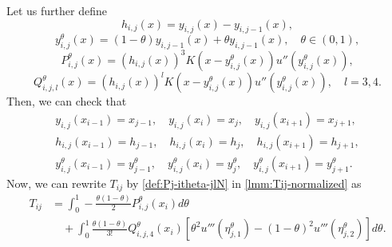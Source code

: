 \documentclass{amsart}
\newtheorem{lemma}[theorem]{Lemma}
\theoremstyle{definition}
\theoremstyle{remark}
\numberwithin{equation}{section}
\begin{document}
Let us further define 
  \begin{equation} \label{def:hij}
    h_{i,j}(x) = y_{i,j}(x) - y_{i,j-1}(x),
  \end{equation}
  \begin{equation} \label{def:yijt}
    y_{i,j}^\theta(x) = (1-\theta) y_{i,j-1}(x) + \theta y_{i,j-1}(x), \quad \theta \in (0, 1),
  \end{equation}
  \begin{equation} \label{def:Pj-itheta-jlN}
    {P_{i,j}^\theta}(x) = ({h_{i,j}}(x))^3  K(x - {y_{i,j}^\theta}(x) ) u''({y_{i,j}^\theta}(x)),
  \end{equation}
  \begin{equation} \label{def:Qj-itheta-jlN}
    {Q_{i,j,l}^{\theta}}(x) = ({h_{i,j}}(x))^l K(x - {y_{i,j}^\theta}(x)) u''({y_{i,j}^\theta}(x)), \quad l=3, 4.
  \end{equation}
Then, we can check that
\begin{equation} \label{eq:prop-of-GMFs}
    \begin{gathered}
      y_{i,j}(x_{i-1}) = x_{j-1}, \quad y_{i,j}(x_{i}) = x_{j}, \quad y_{i,j}(x_{i+1}) = x_{j+1}, \\
      h_{i,j}(x_{i-1}) = h_{j-1}, \quad h_{i,j}(x_{i}) = h_j, \quad h_{i,j}(x_{i+1}) = h_{j+1}, \\
      y_{i,j}^\theta(x_{i-1}) = y_{j-1}^\theta, \quad y_{i,j}^\theta(x_{i}) = y_{j}^\theta, \quad y_{i,j}^\theta(x_{i+1}) = y_{j+1}^\theta.
    \end{gathered}
\end{equation}
Now, we can rewrite \(T_{ij}\) by \eqref{def:Pj-itheta-jlN} in \eqref{lmm:Tij-normalized} as
  \begin{equation} \label{lmm:Tij-express-as-int-of-function}
    \begin{aligned}
      T_{ij} & = \int_{0}^{1} -\frac{\theta (1-\theta)}{2} {P_{i,j}^\theta}(x_i) d\theta    \\
             & \quad + \int_{0}^{1} \frac{\theta (1-\theta)}{3!}{Q_{i,j,4}^\theta}(x_i) \left[ \theta^2  u'''(\eta_{j,1}^\theta) - (1-\theta)^2 u'''(\eta_{j,2}^\theta) \right] d\theta.
    \end{aligned}
  \end{equation}
\end{document}
